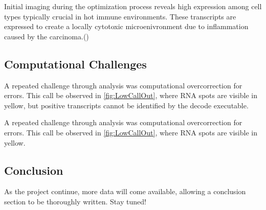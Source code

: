 \documentclass[Endo]{subfiles}
\begin{document}
Initial imaging during the optimization process reveals high expression among cell types typically crucial in hot immune environments. These transcripts are expressed to create a locally cytotoxic microenivronment due to inflammation caused by the carcinoma.(\cite{Van:2014}) 


\cite{CCLE:2022}
\cite{TCGA:2020}

\hypertarget{Computational-Challenges}{}
\subsection{Computational Challenges}\label{subsec:challenges}

A repeated challenge through analysis was computational overcorrection for errors. This call be observed in \ref{fig:LowCallOut}, where RNA spots are visible in yellow, but positive transcripts cannot be identified by the decode executable. 

\renewcommand{\figName}{LowCallOut}
\renewcommand{\figFile}{\figName}
\hypertarget{\figFile}{}


A repeated challenge through analysis was computational overcorrection for errors. This call be observed in \ref{fig:LowCallOut}, where RNA spots are visible in yellow.



\hypertarget{Conclusion}{}
\subsection{Conclusion}\label{subsec:challenges}

As the project continue, more data will come available, allowing a conclusion section to be thoroughly written. Stay tuned!

\pagebreak

\onlyinsubfile{}
\end{document}
